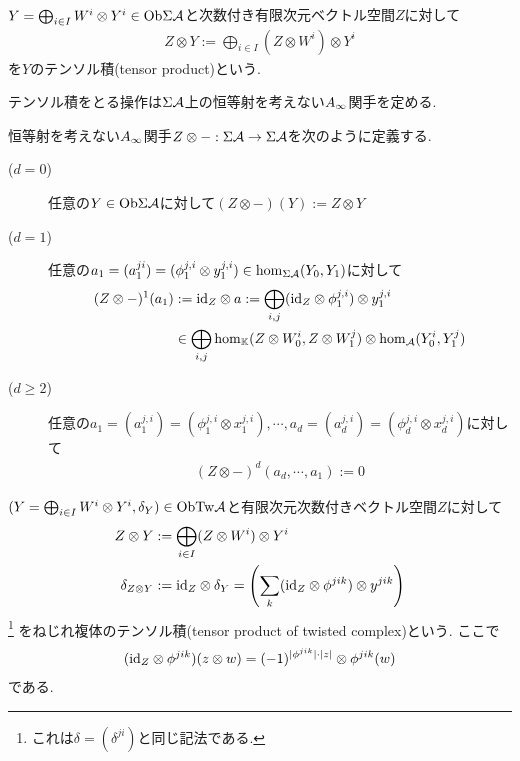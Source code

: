 \documentclass[uplatex, a4paper, 14Q, dvipdfmx]{jsarticle}
\begin{document}
\begin{definition}[加法的拡大のテンソル積]
  $Y = \bigoplus_{i \in I} W^i \otimes Y^i \in \mathrm{Ob}\Sigma\mathcal{A}$と次数付き有限次元ベクトル空間$Z$に対して
  \begin{align*}
    Z \otimes Y 
    := \bigoplus_{i \in I} (Z \otimes W^i) \otimes Y^i
  \end{align*}
  を$Y$のテンソル積(tensor product)という. 
\end{definition}

テンソル積をとる操作は$\Sigma\mathcal{A}$上の恒等射を考えない$A_{\infty}$関手を定める.

\begin{definition}
  恒等射を考えない$A_{\infty}$関手$Z \otimes - : \Sigma\mathcal{A} \to \Sigma\mathcal{A}$を次のように定義する.
  \begin{description}
    \item[($d=0$)] 任意の$Y \in \mathrm{Ob}\Sigma\mathcal{A}$に対して$(Z \otimes -)(Y) := Z \otimes Y$
    \item[($d=1$)] 任意の$a_1 = (a_1^{ji}) = (\phi_1^{j,i} \otimes y_1^{j,i}) \in \hom_{\Sigma\mathcal{A}}(Y_0,Y_1)$に対して
    \begin{align*}
      (Z \otimes -)^1(a_1) 
      &:= \mathrm{id}_Z \otimes a 
      := \bigoplus_{i,j} (\mathrm{id}_Z \otimes \phi_1^{j,i}) \otimes y_1^{j,i} \\
      &\in \bigoplus_{i,j} \hom_{\mathbb{K}}(Z \otimes W_0^i, Z \otimes W_1^j) \otimes \hom_{\mathcal{A}}(Y_0^i,Y_1^j)
    \end{align*}
    \item[($d \geq 2$)] 任意の$a_1 = (a_1^{j,i}) = (\phi_1^{j,i} \otimes x_1^{j,i}), \cdots, a_d = (a_d^{j,i}) = (\phi_d^{j,i} \otimes x_d^{j,i})$に対して
    \begin{align*}
      (Z \otimes -)^d(a_d,\cdots,a_1)
      := 0
    \end{align*}
  \end{description}
\end{definition}

\begin{definition}[ねじれ複体のテンソル積]
  $(Y = \bigoplus_{i \in I} W^i \otimes Y^i, \delta_Y) \in \mathrm{Ob}\mathrm{Tw}\mathcal{A}$と有限次元次数付きベクトル空間$Z$に対して
  \begin{align*}
    Z \otimes Y 
    &:= \bigoplus_{i \in I} (Z \otimes W^i) \otimes Y^i \\
    \delta_{Z \otimes Y}
    &:= \mathrm{id}_Z \otimes \delta_Y 
    = \qty(\sum_{k} (\mathrm{id}_Z \otimes \phi^{jik}) \otimes y^{jik})
  \end{align*}
  \footnote{
    これは$\delta = (\delta^{ji})$と同じ記法である. 
  }
  をねじれ複体のテンソル積(tensor product of twisted complex)という. 
  ここで
  \begin{align*}
    (\mathrm{id}_Z \otimes \phi^{jik})(z \otimes w) 
    = (-1)^{|\phi^{jik}| \cdot |z|} \otimes \phi^{jik}(w)
  \end{align*}
  である.
\end{definition}
\end{document}
